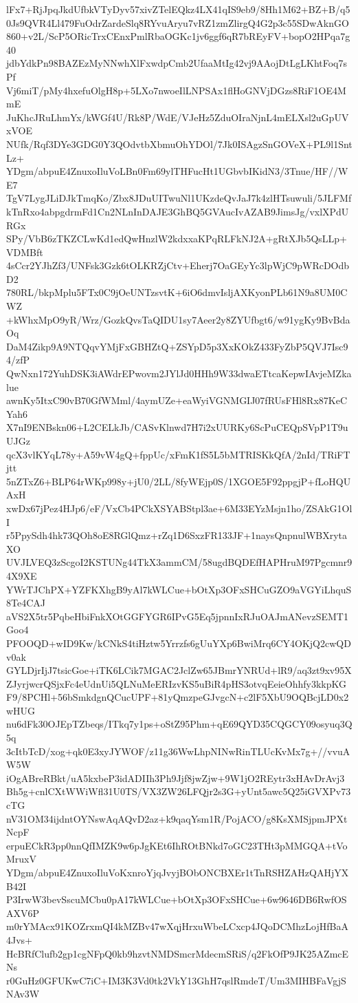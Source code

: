 lFx7+RjJpqJkdUfbkVTyDyv57xivZTelEQkz4LX41qIS9eb9/8Hh1M62+BZ+B/q5
0Js9QVR4Ll479FuOdrZardeSlq8RYvuAryu7vRZ1zmZlirgQ4G2p3c55SDwAknGO
860+v2L/ScP5ORicTrxCEnxPmlRbaOGKc1jv6ggf6qR7bREyFV+bopO2HPqa7g40
jdbYdkPn98BAZEzMyNNwhXlFxwdpCmb2UfaaMtIg42vj9AAojDtLgLKhtFoq7sPf
Vj6miT/pMy4hxefuOlgH8p+5LXo7nwoeIlLNPSAx1flHoGNVjDGzs8RiF1OE4MmE
JuKhcJRuLhmYx/kWGf4U/Rk8P/WdE/VJeHz5ZduOIraNjnL4mELXsl2uGpUVxVOE
NUfk/Rqf3DYe3GDG0Y3QOdvtbXbmuOhYDOl/7Jk0ISAgzSnGOVeX+PL9l1SntLz+
YDgm/abpuE4ZnuxoIluVoLBn0Fm69ylTHFucHt1UGbvbIKidN3/3Tnue/HF//WE7
TgV7LygJLiDJkTmqKo/Zbx8JDuUITwuNl1UKzdeQvJaJ7k4zlHTsuwuli/5JLFMf
kTnRxo4abpgdrmFd1Cn2NLnInDAJE3GhBQ5GVAucIvAZAB9JimsJg/vxlXPdURGx
SPy/VbB6zTKZCLwKd1edQwHnzlW2kdxxaKPqRLFkNJ2A+gRtXJb5QsLLp+VDMBft
4sCcr2YJhZf3/UNFsk3Gzk6tOLKRZjCtv+Eherj7OaGEyYc3lpWjC9pWRcDOdbD2
780RL/bkpMplu5FTx0C9jOeUNTzsvtK+6iO6dmvIsljAXKyonPLb61N9a8UM0CWZ
+kWhxMpO9yR/Wrz/GozkQvsTaQIDU1sy7Aeer2y8ZYUfbgt6/w91ygKy9BvBdaOq
DaM4Zikp9A9NTQqvYMjFxGBHZtQ+ZSYpD5p3XxKOkZ433FyZbP5QVJ7Isc94/zfP
QwNxn172YuhDSK3iAWdrEPwovm2JYlJd0HHh9W33dwaETtcaKepwIAvjeMZkalue
awnKy5ItxC90vB70GfWMml/4aymUZe+eaWyiVGNMGIJ07fRUsFHl8Rx87KeCYah6
X7nI9ENBskn06+L2CELkJb/CASvKlnwd7H7i2xUURKy6ScPuCEQpSVpP1T9uUJGz
qcX3vlKYqL78y+A59vW4gQ+fppUc/xFmK1fS5L5bMTRISKkQfA/2nId/TRiFTjtt
5nZTxZ6+BLP64rWKp998y+jU0/2LL/8fyWEjp0S/1XGOE5F92ppgjP+fLoHQUAxH
xwDx67jPez4HJp6/eF/VxCb4PCkXSYABStpl3ae+6M33EYzMsjn1ho/ZSAkG1OlI
r5PpySdh4hk73QOh8oE8RGlQmz+rZq1D6SxzFR133JF+1naysQnpnulWBXrytaXO
UVJLVEQ3zScgoI2KSTUNg44TkX3ammCM/58ugdBQDEfHAPHruM97Pgcmnr94X9XE
YWrTJChPX+YZFKXhgB9yAl7kWLCue+bOtXp3OFxSHCuGZO9aVGYiLhquS8Te4CAJ
aVS2X5tr5PqbeHbiFnkXOtGGFYGR6IPvG5Eq5jpnnIxRJuOAJmANevzSEMT1Goo4
PFOOQD+wID9Kw/kCNkS4tiHztw5Yrrzfs6gUuYXp6BwiMrq6CY4OKjQ2cwQDv0ak
GYLDjrIjJ7tsicGoe+iTK6LCik7MGAC2JclZw65JBmrYNRUd+lR9/aq3zt9xv95X
ZJyrjwcrQSjxFc4eUdnUi5QLNuMeERIzvKS5uBiR4pHS3otvqEeieOhhfy3kkpKG
F9/8PCHl+56bSmkdgnQCucUPF+81yQmzpeGJvgcN+c2lF5XbU9OQBcjLD0x2wHUG
nu6dFk30OJEpTZbeqs/ITkq7y1ps+oStZ95Phm+qE69QYD35CQGCY09osyuq3Q5q
3cItbTcD/xog+qk0E3xyJYWOF/z11g36WwLhpNINwRinTLUcKvMx7g+//vvuAW5W
iOgABreRBkt/uA5kxbeP3idADIIh3Ph9Jjf8jwZjw+9W1jO2REytr3xHAvDrAvj3
Bh5g+cnlCXtWWiWfl31U0TS/VX3ZW26LFQjr2s3G+yUnt5awc5Q25iGVXPv73cTG
nV31OM34ijdntOYNswAqAQvD2az+k9qaqYsm1R/PojACO/g8KsXMSjpmJPXtNcpF
erpuECkR3pp0nnQfIMZK9w6pJgKEt6IhROtBNkd7oGC23THt3pMMGQA+tVoMruxV
YDgm/abpuE4ZnuxoIluVoKxnroYjqJvyjBObONCBXEr1tTnRSHZAHzQAHjYXB42I
P3IrwW3bevSscuMCbu0pA17kWLCue+bOtXp3OFxSHCue+6w9646DB6RwfOSAXV6P
m0rYMAcx91KOZrxmQI4kMZBv47wXqjHrxuWbeLCxcp4JQoDCMhzLojHfBaA4Jvs+
HcBRfClufb2gp1cgNFpQ0kb9hzvtNMDSmcrMdecmSRiS/q2FkOfP9JK25AZmcENs
r0GuHz0GFUKwC7iC+IM3K3Vd0tk2VkY13GhH7qslRmdeT/Um3MIHBFaVgjSNAv3W
